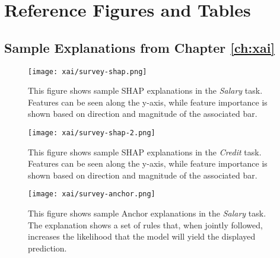 

\chapter{\label{app:figures}Reference Figures and Tables}

\minitoc

\section{Sample Explanations from Chapter \ref{ch:xai}}\label{app:xaifigures}

\begin{figure}[!htbp]
    \centering
    \texttt{[image: xai/survey-shap.png]}
    \caption{This figure shows sample SHAP explanations in the \emph{Salary} task. Features can be seen along the y-axis, while feature importance is shown based on direction and magnitude of the associated bar.}
    \label{fig:shapsalaryfull}
\end{figure}

\begin{figure}[!hbtp]
    \centering
    \texttt{[image: xai/survey-shap-2.png]}
    \caption{This figure shows sample SHAP explanations in the \emph{Credit} task. Features can be seen along the y-axis, while feature importance is shown based on direction and magnitude of the associated bar.}
    \label{fig:shapcreditfull}
\end{figure}

\begin{figure}[!hbtp]
    \centering
    \texttt{[image: xai/survey-anchor.png]}
    \caption{This figure shows sample Anchor explanations in the \emph{Salary} task. The explanation shows a set of rules that, when jointly followed, increases the likelihood that the model will yield the displayed prediction.}
    \label{fig:anchorsalaryfull}
\end{figure}

